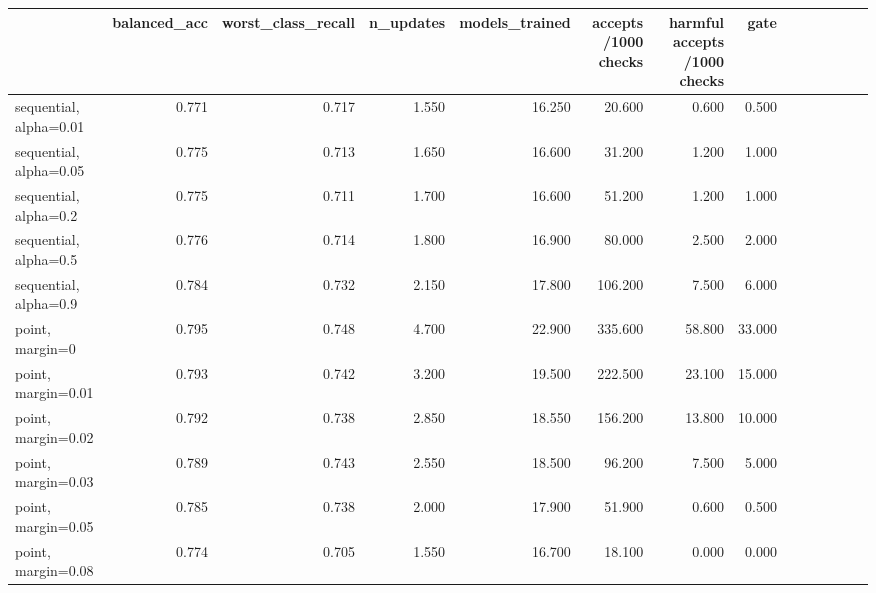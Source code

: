 \begin{tabular}{lrrrrrrr}
\toprule
 & balanced_acc & worst_class_recall & n_updates & models_trained & accepts /1000 checks & harmful accepts /1000 checks & %
gate &  &  &  &  &  &  &  \\
\midrule
sequential, alpha=0.01 & 0.771 & 0.717 & 1.550 & 16.250 & 20.600 & 0.600 & 0.500 \\
sequential, alpha=0.05 & 0.775 & 0.713 & 1.650 & 16.600 & 31.200 & 1.200 & 1.000 \\
sequential, alpha=0.2 & 0.775 & 0.711 & 1.700 & 16.600 & 51.200 & 1.200 & 1.000 \\
sequential, alpha=0.5 & 0.776 & 0.714 & 1.800 & 16.900 & 80.000 & 2.500 & 2.000 \\
sequential, alpha=0.9 & 0.784 & 0.732 & 2.150 & 17.800 & 106.200 & 7.500 & 6.000 \\
point, margin=0 & 0.795 & 0.748 & 4.700 & 22.900 & 335.600 & 58.800 & 33.000 \\
point, margin=0.01 & 0.793 & 0.742 & 3.200 & 19.500 & 222.500 & 23.100 & 15.000 \\
point, margin=0.02 & 0.792 & 0.738 & 2.850 & 18.550 & 156.200 & 13.800 & 10.000 \\
point, margin=0.03 & 0.789 & 0.743 & 2.550 & 18.500 & 96.200 & 7.500 & 5.000 \\
point, margin=0.05 & 0.785 & 0.738 & 2.000 & 17.900 & 51.900 & 0.600 & 0.500 \\
point, margin=0.08 & 0.774 & 0.705 & 1.550 & 16.700 & 18.100 & 0.000 & 0.000 \\
\bottomrule
\end{tabular}
